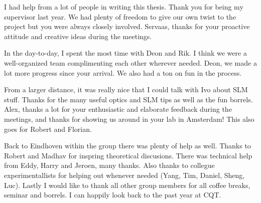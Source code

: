 \noindent I had help from a lot of people in writing this thesis.
Thank you for being my supervisor last year. 
We had plenty of freedom to give our own twist to the project but you were always closely involved.
Servaas, thanks for your proactive attitude and creative ideas during the meetings. 

In the day-to-day, I spent the most time with Deon and Rik. 
I think we were a well-organized team complimenting each other wherever needed.
Deon, we made a lot more progress since your arrival. 
We also had a ton on fun in the process.

From a larger distance, it was really nice that I could talk with Ivo about SLM stuff.
Thanks for the many useful optics and SLM tips as well as the fun borrels.
Alex, thanks a lot for your enthusiastic and elaborate feedback during the meetings, and thanks for showing us around in your lab in Amsterdam!
This also goes for Robert and Florian. 

Back to Eindhoven within the group there was plenty of help as well.
Thanks to Robert and Madhav for inspring theoretical discusions.
There was technical help from Eddy, Harry and Jeroen, many thanks.
Also thanks to collegue experimentallists for helping out whenever needed (Yang, Tim, Daniel, Sheng, Luc).
Lastly I would like to thank all other group members for all coffee breaks, seminar and borrels. 
I can happily look back to the past year at CQT. 
